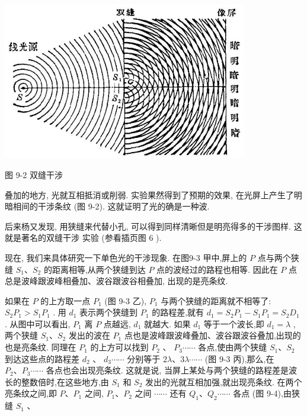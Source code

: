 \documentclass[10pt]{article}
\begin{document}
\begin{center}
\includegraphics[max width=0.8\textwidth]{images/01913056-1f15-74d8-9184-9aab52c9d66b_300_856863.jpg}
\end{center}

图 9-2 双缝干涉

叠加的地方, 光就互相抵消或削弱. 实验果然得到了预期的效果, 在光屏上产生了明暗相间的干涉条纹 (图 9-2). 这就证明了光的确是一种波.

后来杨又发现, 用狭缝来代替小孔, 可以得到同样清晰但是明亮得多的干涉图样. 这就是著名的双缝干涉 实验 (参看插页图 6 ).

现在, 我们来具体研究一下单色光的干涉现象. 在图9-3 甲中,屏上的 \(P\) 点与两个狭缝 \({S}_{1}\text{、}{S}_{2}\) 的距离相等,从两个狭缝到达 \(P\) 点的波经过的路程也相等. 因此在 \(P\) 点总是波峰跟波峰相叠加、波谷跟波谷相叠加, 出现的是亮条纹.

如果在 \(P\) 的上方取一点 \({P}_{1}\) (图 9-3 乙), \({P}_{1}\) 与两个狭缝的距离就不相等了: \({S}_{2}{P}_{1} > {S}_{1}{P}_{1}\) . 用 \({d}_{1}\) 表示两个狭缝到 \({P}_{1}\) 的路程差,就有 \({d}_{1} = {S}_{2}{P}_{1} - {S}_{1}{P}_{1} = {S}_{2}{D}_{1}\) . 从图中可以看出, \({P}_{1}\) 离 \(P\) 点越远, \({d}_{1}\) 就越大. 如果 \({d}_{1}\) 等于一个波长,即 \({d}_{1} = \lambda\) ,两个狭缝 \({S}_{1}\text{、}{S}_{2}\) 发出的波在 \({P}_{1}\) 点也是波峰跟波峰叠加、波谷跟波谷叠加,出现的也是亮条纹. 同理在 \({P}_{1}\) 的上方可以找到 \({P}_{2}\) 、 \({P}_{3}\cdots \cdots\) 各点,使由两个狭缝 \({S}_{1}\text{、}{S}_{2}\) 到达这些点的路程差 \({d}_{2}\) 、 \({d}_{3}\cdots \cdots\) 分别等于 \({2\lambda }\text{、}{3\lambda }\cdots \cdots\) (图 9-3 丙),那么,在 \({P}_{2}\text{、}{P}_{3}\cdots \cdots\) 各点也会出现亮条纹. 这就是说, 当屏上某处与两个狭缝的路程差是波长的整数倍时,在这些地方,由 \({S}_{1}\) 和 \({S}_{2}\) 发出的光就互相加强,就出现亮条纹. 在两个亮条纹之间,即 \(P\text{、}{P}_{1}\) 之间, \({P}_{1}\text{、}{P}_{2}\) 之间 \(\cdots \cdots\) 还有 \({Q}_{1}\text{、}{Q}_{2}\cdots \cdots\) 各点 (图 9-4),由狭缝 \({S}_{1}\) 、
\end{document}
